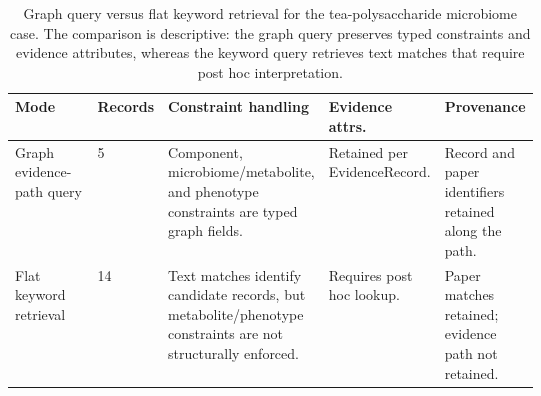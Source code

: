\begin{table}[t]
\centering
\scriptsize
\caption{Graph query versus flat keyword retrieval for the tea-polysaccharide microbiome case. The comparison is descriptive: the graph query preserves typed constraints and evidence attributes, whereas the keyword query retrieves text matches that require post hoc interpretation.}
\label{tab:graph_vs_flat_query}
\begin{tabularx}{\linewidth}{p{0.20\linewidth}p{0.12\linewidth}Xp{0.14\linewidth}p{0.15\linewidth}}
\toprule
Mode & Records & Constraint handling & Evidence attrs. & Provenance \\
\midrule
Graph evidence-path query & 5 & Component, microbiome/metabolite, and phenotype constraints are typed graph fields. & Retained per EvidenceRecord. & Record and paper identifiers retained along the path. \\
Flat keyword retrieval & 14 & Text matches identify candidate records, but metabolite/phenotype constraints are not structurally enforced. & Requires post hoc lookup. & Paper matches retained; evidence path not retained. \\
\bottomrule
\end{tabularx}
\end{table}
